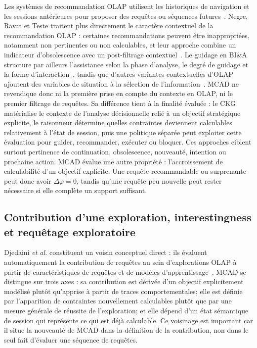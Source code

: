 \documentclass[journal]{IEEEtran}
\begin{document}
Les systèmes de recommandation OLAP utilisent les historiques de navigation et les sessions antérieures pour proposer des requêtes ou séquences futures~\cite{AligonDSS2015}. Negre, Ravat et Teste traitent plus directement le caractère contextuel de la recommandation OLAP : certaines recommandations peuvent être inappropriées, notamment non pertinentes ou non calculables, et leur approche combine un indicateur d'obsolescence avec un post-filtrage contextuel~\cite{NegreRavatTeste2018}. Le guidage en BI\&A structure par ailleurs l'assistance selon la phase d'analyse, le degré de guidage et la forme d'interaction~\cite{GunklachNadj2023}, tandis que d'autres variantes contextuelles d'OLAP ajoutent des variables de situation à la sélection de l'information~\cite{RoyContextOLAP2022}. MCAD ne revendique donc ni la première prise en compte du contexte en OLAP, ni le premier filtrage de requêtes. Sa différence tient à la finalité évaluée : le CKG matérialise le contexte de l'analyse décisionnelle relié à un objectif stratégique explicite, le raisonneur détermine quelles contraintes deviennent calculables relativement à l'état de session, puis une politique séparée peut exploiter cette évaluation pour guider, recommander, exécuter ou bloquer.
Ces approches ciblent surtout pertinence de continuation, obsolescence, nouveauté, intention ou prochaine action. MCAD évalue une autre propriété : l'accroissement de calculabilité d'un objectif explicite. Une requête recommandable ou surprenante peut donc avoir $\Delta\varphi=0$, tandis qu'une requête peu nouvelle peut rester nécessaire si elle complète un support suffisant.

\subsection{Contribution d'une exploration, interestingness et requêtage exploratoire}

Djedaini \emph{et al.} constituent un voisin conceptuel direct : ils évaluent automatiquement la contribution de requêtes au sein d'explorations OLAP à partir de caractéristiques de requêtes et de modèles d'apprentissage~\cite{DjedainiEtAl2019}. MCAD se distingue sur trois axes : sa contribution est dérivée d'un objectif explicitement modélisé plutôt qu'apprise à partir de traces comportementales; elle est définie par l'apparition de contraintes nouvellement calculables plutôt que par une mesure générale de réussite de l'exploration; et elle dépend d'un état sémantique de session qui représente ce qui est déjà calculable. Ce voisinage est important car il situe la nouveauté de MCAD dans la définition de la contribution, non dans le seul fait d'évaluer une séquence de requêtes.
\end{document}
